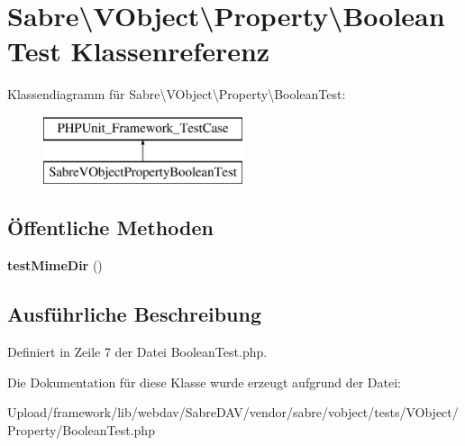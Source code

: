 \hypertarget{class_sabre_1_1_v_object_1_1_property_1_1_boolean_test}{}\section{Sabre\textbackslash{}V\+Object\textbackslash{}Property\textbackslash{}Boolean\+Test Klassenreferenz}
\label{class_sabre_1_1_v_object_1_1_property_1_1_boolean_test}
Klassendiagramm für Sabre\textbackslash{}V\+Object\textbackslash{}Property\textbackslash{}Boolean\+Test\+:\begin{figure}[H]
\begin{center}
\leavevmode
\includegraphics[height=2.000000cm]{class_sabre_1_1_v_object_1_1_property_1_1_boolean_test}
\end{center}
\end{figure}
\subsection*{Öffentliche Methoden}
\begin{DoxyCompactItemize}
\item 
\mbox{\label{class_sabre_1_1_v_object_1_1_property_1_1_boolean_test_a997ff13d41f858f40c93414f06707677}} 
{\bfseries test\+Mime\+Dir} ()
\end{DoxyCompactItemize}


\subsection{Ausführliche Beschreibung}


Definiert in Zeile 7 der Datei Boolean\+Test.\+php.



Die Dokumentation für diese Klasse wurde erzeugt aufgrund der Datei\+:\begin{DoxyCompactItemize}
\item 
Upload/framework/lib/webdav/\+Sabre\+D\+A\+V/vendor/sabre/vobject/tests/\+V\+Object/\+Property/Boolean\+Test.\+php\end{DoxyCompactItemize}
